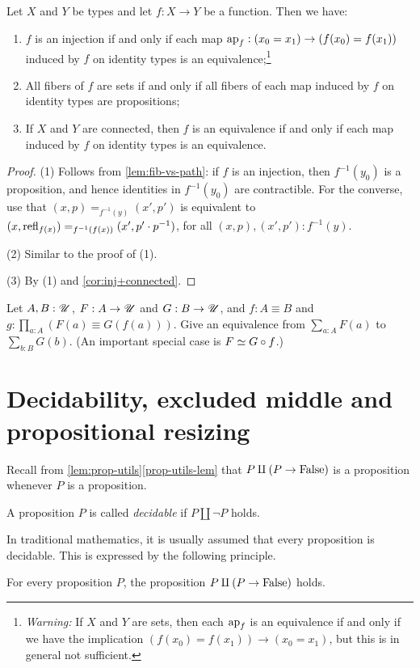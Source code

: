 \begin{corollary}\label{cor:fib-vs-path}\label{lem:eqandcovofconntypes}
Let $X$ and $Y$ be types and let $f:X\to Y$ be a function. Then we have:
\begin{enumerate}
\item\label{prop-fib-vs-path}
  $f$ is an injection if and only if each map $\ap{f} : (x_0 = x_1) \to (f(x_0) = f(x_1))$ induced by $f$
  on identity types is an equivalence;\footnote{%
    \emph{Warning:}
    If $X$ and $Y$ are sets, then each $\ap{f}$ is an equivalence
    if and only if we have the implication $(f(x_0) = f(x_1)) \to (x_0 = x_1)$,
    but this is in general not sufficient.}
\item\label{set-fib-vs-path}
All fibers of $f$ are sets if and only if all fibers of each map induced by $f$ on identity types are propositions;
\item\label{conn-fib-vs-path}
If $X$ and $Y$ are connected, then $f$ is an equivalence
if and only if each map induced by $f$ on identity types is an equivalence.
\end{enumerate}
\end{corollary}
\begin{proof}
(1) Follows from \cref{lem:fib-vs-path}: if $f$ is an injection,
then $f^{-1}(y_0)$ is a proposition, and hence identities in $f^{-1}(y_0)$
are contractible. For the converse, use that $(x,p)=_{f^{-1}(y)}(x',p')$ is
equivalent to $(x,\mathrm{refl}_{f(x)}) =_{f^{-1}(f(x))} (x',p'\cdot p^{-1})$,
for all $(x,p),(x',p') : f^{-1}(y)$.

(2) Similar to the proof of (1).

(3) By (1) and \cref{cor:inj+connected}.
\end{proof}

\begin{xca}\label{xca:sum-equivalences}
Let $A,B:{\mathscr{U}}$, $F:A\to{\mathscr{U}}$ and $G:B\to{\mathscr{U}}$,
and $f: A\equiv B$ and $g:\prod_{a:A}(F(a) \equiv G(f(a)))$.
Give an equivalence from $\sum_{a:A} F(a)$ to $\sum_{b:B} G(b)$.
(An important special case is $F\jdeq G\circ f$.)
\end{xca}


\section{Decidability, excluded middle and propositional resizing}
\label{sec:decidability}

Recall from \cref{lem:prop-utils}\ref{prop-utils-lem} that $P\amalg (P \to
\mathrm{False})$ is a proposition whenever $P$ is a proposition.
\begin{definition}\label{def:decidability}
  A proposition $P$ is called \emph{decidable}
  if $P\amalg\neg P$ holds.
\end{definition}
In traditional mathematics, it is usually assumed that
every proposition is decidable.
This is expressed by the following principle.
\begin{principle}
  \label{pri:lem}%
  For every proposition $P$, the proposition $P\amalg (P\to \mathrm{False})$ holds.
\end{principle}

